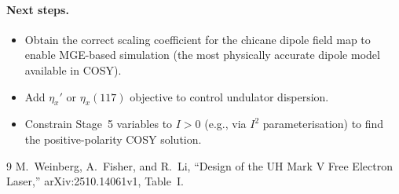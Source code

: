 \documentclass[11pt]{article}
\begin{document}
\paragraph{Next steps.}
\begin{itemize}
  \item Obtain the correct scaling coefficient for the chicane dipole field
    map to enable MGE-based simulation (the most physically accurate
    dipole model available in COSY).
  \item Add $\eta_x'$ or $\eta_x(117)$ objective to control undulator dispersion.
  \item Constrain Stage~5 variables to $I > 0$ (e.g., via $I^2$
    parameterisation) to find the positive-polarity COSY solution.
\end{itemize}


\begin{thebibliography}{9}
  M.~Weinberg, A.~Fisher, and R.~Li,
  ``Design of the UH Mark V Free Electron Laser,''
  arXiv:2510.14061v1, Table~I.
\end{thebibliography}
\end{document}
